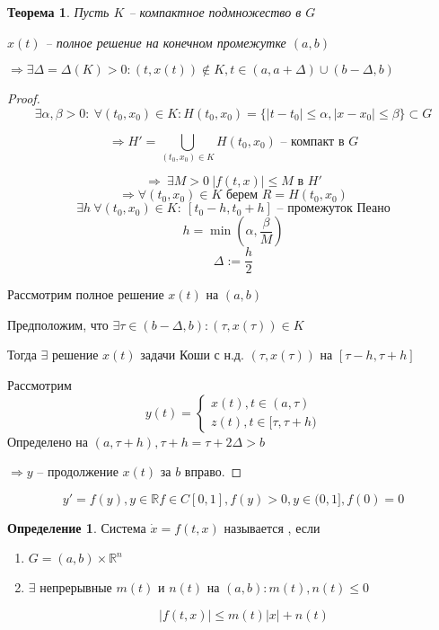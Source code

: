\documentclass[a4paper]{article}
\theoremstyle{indented}
\newtheorem*{theorem}{Теорема}
\theoremstyle{definition}
\newtheorem*{defn}{Определение}
\theoremstyle{remark}
\begin{document}
\begin{theorem}

  Пусть $K$ -- компактное подмножество в $G$

  $x(t)$ -- полное решение на  конечном промежутке $(a,b)$

  $\Rightarrow \exists \Delta = \Delta(K) > 0: (t,x(t)) \not \in K, t \in (a,a + \Delta) \cup (b - \Delta, b)$
\end{theorem}
\begin{proof}
  \[\exists \alpha, \beta > 0 : \ \forall (t_0,x_0) \in K : H(t_0,x_0) = \{|t - t_0| \leqslant \alpha, |x - x_0 | \leqslant \beta \} \subset G\]

  \[\Rightarrow H' = \bigcup\limits_{(t_0,x_0) \in K} H(t_0,x_0) \text{ -- компакт в }G\]

  \[\Rightarrow \ \exists M > 0 \ |f(t,x)| \leqslant M \text{ в } H'\] 
  \[\Rightarrow \forall (t_0,x_0) \in K \text{ берем } R = H(t_0,x_0)\]
  \[\exists h \ \forall (t_0,x_0) \in K: \ [t_0-h,t_0+h] \text{ -- промежуток Пеано}\]
  \[h = \min( \alpha, \frac{\beta}{M})\]
  \[\Delta := \frac{h}{2}\]

  Рассмотрим полное решение $x(t) $ на  $(a,b)$

  Предположим, что $\exists \tau \in (b - \Delta,b) : (\tau,x(\tau)) \in K$

  Тогда $\exists$ решение $x(t)$ задачи Коши с н.д. $ (\tau,x(\tau))$ на $[\tau - h,\tau + h]$

  Рассмотрим \[y(t) = \begin{cases}
      x(t) , t \in (a,\tau)\\
      z(t) ,  t \in [\tau, \tau + h)
    \end{cases}\]
  Определено на $(a,\tau + h), \tau + h = \tau + 2 \Delta > b$

  $\Rightarrow  y$ -- продолжение $x(t)$ за $b$ вправо.
\end{proof}

\[y' = f(y), y \in \mathbb{R} f \in C[0,1], f(y) > 0, y \in (0,1], f(0) = 0\]



\begin{defn}
  Система $\dot x = f(t,x)$ называется , если

  \begin{enumerate}
  \item $G = (a,b) \times \mathbb{R}^n$
  \item $\exists$ непрерывные $m(t)$ и $n(t)$ на $(a,b): m(t), n(t) \leqslant 0$

    \[|f(t,x)| \leqslant m(t)|x| + n(t)\]
  \end{enumerate}
\end{defn}
\end{document}
